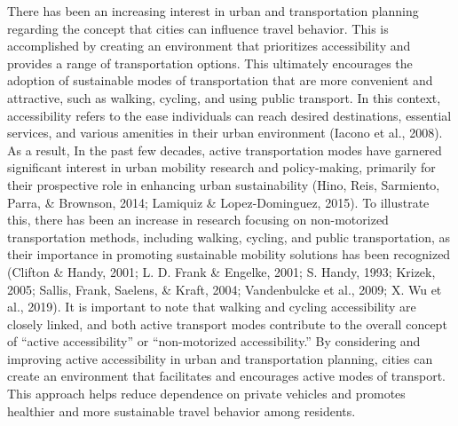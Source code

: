 \documentclass[12pt,twoside]{reedthesis}
\begin{document}
There has been an increasing interest in urban and transportation planning regarding the concept that cities can influence travel behavior. This is accomplished by creating an environment that prioritizes accessibility and provides a range of transportation options. This ultimately encourages the adoption of sustainable modes of transportation that are more convenient and attractive, such as walking, cycling, and using public transport. In this context, accessibility refers to the ease individuals can reach desired destinations, essential services, and various amenities in their urban environment (Iacono et al., 2008). As a result, In the past few decades, active transportation modes have garnered significant interest in urban mobility research and policy-making, primarily for their prospective role in enhancing urban sustainability (Hino, Reis, Sarmiento, Parra, \& Brownson, 2014; Lamiquiz \& Lopez-Dominguez, 2015). To illustrate this, there has been an increase in research focusing on non-motorized transportation methods, including walking, cycling, and public transportation, as their importance in promoting sustainable mobility solutions has been recognized (Clifton \& Handy, 2001; L. D. Frank \& Engelke, 2001; S. Handy, 1993; Krizek, 2005; Sallis, Frank, Saelens, \& Kraft, 2004; Vandenbulcke et al., 2009; X. Wu et al., 2019). It is important to note that walking and cycling accessibility are closely linked, and both active transport modes contribute to the overall concept of ``active accessibility'' or ``non-motorized accessibility.'' By considering and improving active accessibility in urban and transportation planning, cities can create an environment that facilitates and encourages active modes of transport. This approach helps reduce dependence on private vehicles and promotes healthier and more sustainable travel behavior among residents.
\end{document}
